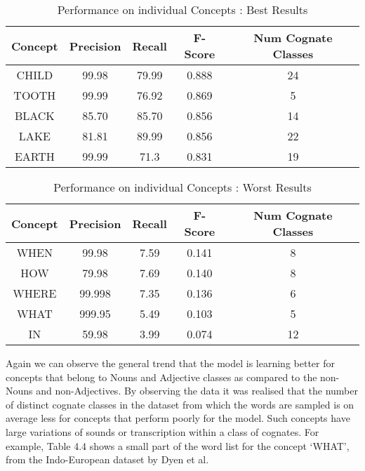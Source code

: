 \begin{table}[h!]
\centering
\begin{tabular}{|c|c|c|c|c|}
\hline
\textbf{Concept} & \textbf{Precision} & \textbf{Recall} & \textbf{F-Score} & \textbf{Num Cognate Classes} \\ \hline
CHILD            & 99.98              & 79.99           & 0.888            & 24                           \\ \hline
TOOTH            & 99.99              & 76.92           & 0.869            & 5                            \\ \hline
BLACK            & 85.70              & 85.70           & 0.856            & 14                           \\ \hline
LAKE             & 81.81              & 89.99           & 0.856            & 22                           \\ \hline
EARTH            & 99.99              & 71.3            & 0.831            & 19                           \\ \hline
\end{tabular}
\caption{Performance on individual Concepts : Best Results}
\end{table}

\begin{table}[h!]
\centering
\label{my-label}
\begin{tabular}{|c|c|c|c|c|}
\hline
\textbf{Concept} & \textbf{Precision} & \textbf{Recall} & \textbf{F-Score} & \textbf{Num Cognate Classes} \\ \hline
WHEN             & 99.98              & 7.59            & 0.141            & 8                            \\ \hline
HOW              & 79.98              & 7.69            & 0.140            & 8                            \\ \hline
WHERE            & 99.998             & 7.35            & 0.136            & 6                            \\ \hline
WHAT             & 999.95             & 5.49            & 0.103            & 5                            \\ \hline
IN               & 59.98              & 3.99            & 0.074            & 12                           \\ \hline
\end{tabular}
\caption{Performance on individual Concepts : Worst Results}
\end{table}

Again we can observe the general trend that the model is learning better for concepts that belong to Nouns and Adjective classes as compared to the non-Nouns and non-Adjectives. By observing the data it was realised that the number of distinct cognate classes in the dataset from which the words are sampled is on average less for concepts that perform poorly for the model. Such concepts have large variations of sounds or transcription within a class of cognates. For example, Table 4.4 shows a small part of the word list for the concept `WHAT', from the Indo-European dataset by Dyen et al.

